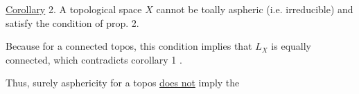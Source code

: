 \uline{Corollary} 2.  A topological space $X$ cannot be toally aspheric (i.e.
irreducible)  and satisfy the condition of prop. 2.

Because for a connected topos,  this  condition implies that $L_X$ is
equally connected,  which contradicts corollary 1 .

Thus,  surely  asphericity for a topos \uline{does not} imply the

